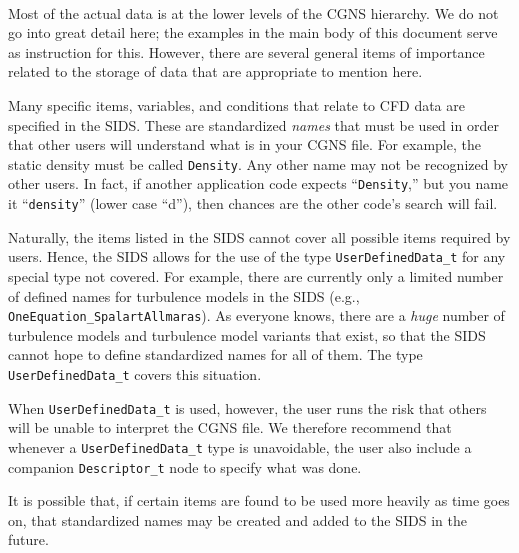 \documentclass[12pt]{article}
\begin{document}
~


Most of the actual data is at the lower levels of the CGNS
hierarchy.  We do not go into great detail here; the examples 
in the main body of this document serve as instruction for this.
However, there are several general items of importance 
related to the storage of data that are appropriate to mention
here.

Many specific items, variables, and conditions that relate to CFD
data are specified in the SIDS.  These are standardized {\it names} 
that must be used in order that other users will understand
what is in your CGNS file.  For example, the static density must
be called {\tt Density}.  Any other name may not be recognized by other
users.  In fact, if another application code expects ``{\tt Density},'' but
you name it ``{\tt density}'' (lower case ``d''), then chances are the
other code's search will fail.

Naturally, the items listed in the SIDS
cannot cover all possible items required by users.
Hence, the SIDS allows for the use of the 
type {\tt UserDefinedData\_t} for any special type not covered.
For example, there are currently only a limited number of
defined names for turbulence models in the SIDS (e.g.,
{\tt OneEquation\_SpalartAllmaras}).  As everyone knows, there
are a {\it huge} number of turbulence models and turbulence model
variants that exist, so that the SIDS cannot hope to
define standardized names for all of them.  The type {\tt UserDefinedData\_t}
covers this situation.

When {\tt UserDefinedData\_t} is used, however, the user runs the risk
that others will be unable to interpret the CGNS file.  We 
therefore recommend
that whenever a {\tt UserDefinedData\_t} type is unavoidable, the user also include
a companion {\tt Descriptor\_t} node to specify what was done.

It is possible that, if certain items are found to be used
more heavily as time goes on, that standardized names may be created and added
to the SIDS in the future.

~

\end{document}
